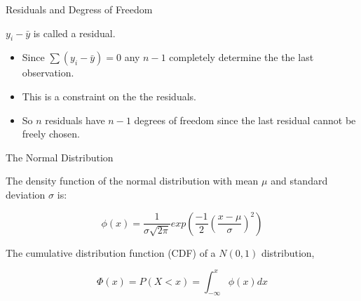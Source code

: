 \documentclass[9pt,ignorenonframetext,]{beamer}
\providecommand{\tightlist}{%
\setlength{\itemsep}{0pt}\setlength{\parskip}{0pt}}
\begin{document}
\begin{frame}{Residuals and Degress of Freedom}

\(y_i-{\bar y}\) is called a residual.

\begin{itemize}
\tightlist
\item
  Since \(\sum (y_i-{\bar y})=0\) any \(n-1\) completely determine the
  the last observation.\\
\item
  This is a constraint on the the residuals.\\
\item
  So \(n\) residuals have \(n-1\) degrees of freedom since the last
  residual cannot be freely chosen.
\end{itemize}

\end{frame}

\begin{frame}{The Normal Distribution}

The density function of the normal distribution with mean \(\mu\) and
standard deviation \(\sigma\) is:

\[ \phi(x)=\frac{1}{\sigma \sqrt{2\pi}}exp\left( \frac{-1}{2} \left(\frac{x-\mu}{\sigma}\right)^2\right)\]

The cumulative distribution function (CDF) of a \(N(0,1)\) distribution,

\[ \Phi(x)= P(X<x)= \int_{-\infty}^x \phi(x)dx\]

\end{frame}
\end{document}
